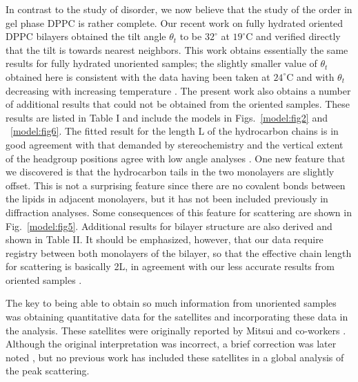 In contrast to the study of disorder, we now believe that the study of
the order in gel phase DPPC is rather complete.  Our recent work 
\cite{STN92} on fully hydrated oriented DPPC 
bilayers obtained the tilt angle ${\theta}_{t}$ 
to be $32^{\circ}$ at $19^{\circ}$C and verified directly that the tilt is
towards nearest neighbors.  This work obtains essentially the 
same results for
fully hydrated unoriented samples; the slightly smaller value of ${\theta}_{t}$ 
obtained here is consistent with the data having been taken at 
$24^{\circ}$C and
with ${\theta}_{t}$ decreasing with increasing temperature \cite{STN92}.
The present work also obtains 
a number of additional results that could not be obtained from the
oriented samples.  These results are listed in Table I and include
the models in Figs.\ \ref{model:fig2} and \  \ref{model:fig6}.
The fitted result for the length L of
the hydrocarbon chains is in good agreement with that demanded by
stereochemistry and the vertical extent of the
headgroup positions agree with low angle analyses \cite{WSN89}.
One new feature
that we discovered is that the hydrocarbon tails in the two monolayers are
slightly offset.  This is not a surprising feature since there are no
covalent bonds between the lipids in adjacent monolayers, but it
has not been included previously in diffraction analyses.  Some consequences
of this feature for scattering are shown in Fig.\ \ref{model:fig5}.
Additional results for bilayer structure are also derived and shown in
Table II.  It should be emphasized, however, that our data require
registry between both monolayers of the bilayer, so that the effective
chain length for scattering is basically 2L, in agreement with our
less accurate results from oriented samples \cite{STN92}.
 
The key to being able to obtain so much information from unoriented samples
was obtaining quantitative data
for the satellites and incorporating these data in the analysis.
These satellites were originally reported by Mitsui and 
co-workers \cite{Mit78}.  Although the original interpretation
was incorrect, a brief correction was later noted \cite{Mit80},
but no previous work has included these satellites in a global analysis of 
the peak scattering.  

